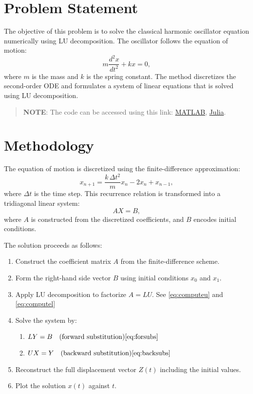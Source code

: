 \section*{Problem Statement}
The objective of this problem is to solve the classical harmonic oscillator equation numerically using LU decomposition. The oscillator follows the equation of motion:
\[
  m \frac{d^2x}{dt^2} + kx = 0,
\]
where $m$ is the mass and $k$ is the spring constant. The method discretizes the second-order ODE and formulates a system of linear equations that is solved using LU decomposition.

\begin{quote}
  \textbf{NOTE}: The code can be accessed using this link: \href{https://raw.githubusercontent.com/HavokSahil/computational-techniques-assignments/refs/heads/main/assignment2/a2.m}{MATLAB}, \href{https://raw.githubusercontent.com/HavokSahil/computational-techniques-assignments/refs/heads/main/assignment2/a2.jl}{Julia}.
\end{quote}

\section*{Methodology}
The equation of motion is discretized using the finite-difference approximation:
\[
  x_{n+1} = \frac{k \, \Delta t^2}{m} x_n - 2x_n + x_{n-1},
\]
where $\Delta t$ is the time step. This recurrence relation is transformed into a tridiagonal linear system:
\[
  AX = B,
\]
where $A$ is constructed from the discretized coefficients, and $B$ encodes initial conditions.

The solution proceeds as follows:
\begin{enumerate}
  \item Construct the coefficient matrix $A$ from the finite-difference scheme.
  \item Form the right-hand side vector $B$ using initial conditions $x_0$ and $x_1$.
  \item Apply LU decomposition to factorize $A = LU$. See \eqref{eq:computeu} and \eqref{eq:computel}
  \item Solve the system by:
\begin{enumerate}
  \item $LY = B \quad \text{(forward substitution)} \hfill \eqref{eq:forsubs}$
  \item $UX = Y \quad \text{(backward substitution)} \hfill \eqref{eq:backsubs}$
\end{enumerate}
  \item Reconstruct the full displacement vector $Z(t)$ including the initial values.
  \item Plot the solution $x(t)$ against $t$.
\end{enumerate}

